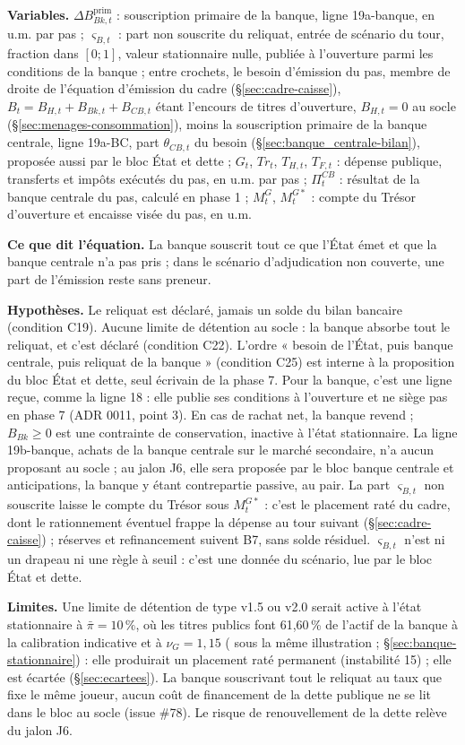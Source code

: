 \documentclass[11pt,a4paper]{article}
\newcommand{\variables}{\par\noindent\textbf{Variables.} }
\newcommand{\sens}{\par\noindent\textbf{Ce que dit l'équation.} }
\newcommand{\hyp}{\par\noindent\textbf{Hypothèses.} }
\newcommand{\limites}{\par\noindent\textbf{Limites.} }
\newcommand{\barre}[1]{\leavevmode\sbox{\boitebarre}{#1}\rlap{\rule[0.6ex]{\wd\boitebarre}{0.4pt}}\usebox{\boitebarre}}
\begin{document}
\begin{proposee}
\variables $\Delta B^{\mathrm{prim}}_{\mathit{Bk},t}$ : souscription primaire de la banque, ligne 19a-banque, en u.m. par pas ; $\varsigma_{B,t}$ : part non souscrite du reliquat, entrée de scénario du tour, fraction dans $[0 ; 1]$, valeur stationnaire nulle, publiée à l'ouverture parmi les conditions de la banque ; entre crochets, le besoin d'émission du pas, membre de droite de l'équation d'émission du cadre (\S\ref{sec:cadre-caisse}), $B_t = B_{H,t} + B_{\mathit{Bk},t} + B_{\mathit{CB},t}$ étant l'encours de titres d'ouverture, $B_{H,t} = 0$ au socle (\S\ref{sec:menages-consommation}), moins la souscription primaire de la banque centrale, ligne 19a-BC, part $\theta_{\mathit{CB},t}$ du besoin (\S\ref{sec:banque_centrale-bilan}), proposée aussi par le bloc État et dette ; $G_t$, $\mathit{Tr}_t$, $T_{H,t}$, $T_{F,t}$ : dépense publique, transferts et impôts exécutés du pas, en u.m. par pas ; $\Pi^{\mathit{CB}}_t$ : résultat de la banque centrale du pas, calculé en phase 1 ; $M^G_t$, $M^{G*}_t$ : compte du Trésor d'ouverture et encaisse visée du pas, en u.m.
\sens La banque souscrit tout ce que l'État émet et que la banque centrale n'a pas pris ; dans le scénario d'adjudication non couverte, une part de l'émission reste sans preneur.
\hyp Le reliquat est déclaré, jamais un solde du bilan bancaire (condition C19). Aucune limite de détention au socle : la banque absorbe tout le reliquat, et c'est déclaré (condition C22). L'ordre « besoin de l'État, puis banque centrale, puis reliquat de la banque » (condition C25) est interne à la proposition du bloc État et dette, seul écrivain de la phase 7. Pour la banque, c'est une ligne reçue, comme la ligne 18 : elle publie ses conditions à l'ouverture et ne siège pas en phase 7 (ADR 0011, point 3). En cas de rachat net, la banque revend ; $B_{\mathit{Bk}} \ge 0$ est une contrainte de conservation, inactive à l'état stationnaire. La ligne 19b-banque, achats de la banque centrale sur le marché secondaire, n'a aucun proposant au socle ; au jalon J6, elle sera proposée par le bloc banque centrale et anticipations, la banque y étant contrepartie passive, au pair. La part $\varsigma_{B,t}$ non souscrite laisse le compte du Trésor sous $M^{G*}_t$ : c'est le placement raté du cadre, dont le rationnement éventuel frappe la dépense au tour suivant (\S\ref{sec:cadre-caisse}) ; réserves et refinancement suivent B7, sans solde résiduel. $\varsigma_{B,t}$ n'est ni un drapeau ni une règle à seuil : c'est une donnée du scénario, lue par le bloc État et dette.
\limites Une limite de détention de type v1.5 ou v2.0 serait active à l'état stationnaire à $\bar\pi = 10\,\%$, où les titres publics font 61,60\,\% de l'actif de la banque à la calibration indicative et à $\nu_G = 1{,}15$ (\barre{63,62\,\%} sous la même illustration ; \S\ref{sec:banque-stationnaire}) : elle produirait un placement raté permanent (instabilité 15) ; elle est écartée (\S\ref{sec:ecartees}). La banque souscrivant tout le reliquat au taux que fixe le même joueur, aucun coût de financement de la dette publique ne se lit dans le bloc au socle (issue \#78). Le risque de renouvellement de la dette relève du jalon J6.


\end{proposee}
\end{document}
